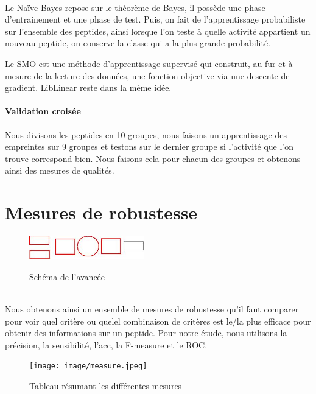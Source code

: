\documentclass[a4paper,10pt]{report}
\begin{document}
	  ~\\Le Naïve Bayes repose sur le théorème de Bayes, il possède une phase d'entrainement et une phase de test.
	  Puis, on fait de l'apprentissage probabiliste sur l'ensemble des peptides, ainsi lorsque l'on teste à quelle activité appartient un nouveau peptide, on conserve la classe qui a la plus grande probabilité.  
	    
	  Le SMO est une méthode d'apprentissage supervisé qui construit, au fur et à mesure de la lecture des données, une fonction objective via une descente de gradient.   
	  LibLinear reste dans la même idée.
	      
	  \paragraph{Validation croisée}
	    
	  Nous divisons les peptides en 10 groupes, nous faisons un apprentissage des empreintes sur 9 groupes et testons sur le dernier groupe si l'activité que l'on trouve correspond bien. Nous faisons cela pour chacun des groupes et obtenons ainsi des mesures de qualités.
	    
     \section{Mesures de robustesse}
     
	  \begin{figure}[!h]
	    \begin{center}
	      \includegraphics[width=5cm]{image/step4.jpeg} \\
	      \caption{Schéma de l'avancée}
	    \end{center}
	 \end{figure}
	  
	  ~\\
	  Nous obtenons ainsi un ensemble de mesures de robustesse qu'il faut comparer pour voir quel critère ou quelel combinaison de critères est le/la plus efficace pour obtenir des informations sur un peptide.
	  Pour notre étude, nous utilisons la précision, la sensibilité, l'acc, la F-measure et le ROC.
	  
	  \begin{figure}[!h]
	    \begin{center}
	      \leftskip -4cm
	      \texttt{[image: image/measure.jpeg]} \\
	      \caption{Tableau résumant les différentes mesures}
	    \end{center}
	  \end{figure}
	  
\end{document}
